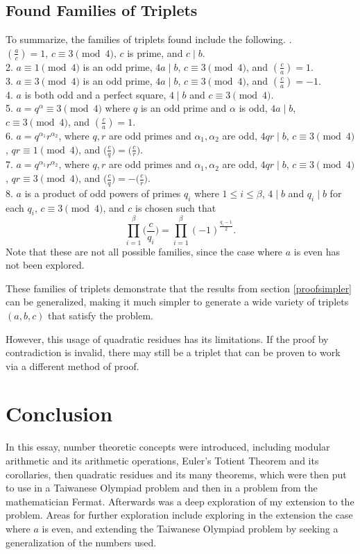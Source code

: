 \documentclass{article}
\newcommand{\al}{\alpha}
\newcommand{\qrB}[2]{\Big( \frac{#1}{#2}\Big)}
\newcommand{\qrbg}[2]{\bigg( \frac{#1}{#2}\bigg)}
\newcommand{\qrn}[2]{\left( \frac{#1}{#2}\right)}
\begin{document}
\subsection{Found Families of Triplets}
\label{foundfamilies}
To summarize, the families of triplets found include the following.
. $\qrn{a}{c} = 1, \hspace{2pt} c \equiv 3 \pmod 4, \hspace{2pt} c$ is prime, and $c \mid b$. \\
2. $a \equiv 1 \pmod 4$ is an odd prime, $4a \mid b$, $c \equiv 3 \pmod 4$, and $\qrn{c}{a}=1$. \\
3. $a \equiv 3 \pmod 4$ is an odd prime, $4a \mid b$, $c \equiv 3 \pmod 4$, and $\qrn{c}{a}=-1$. \\
4. $a$ is both odd and a perfect square, $4 \mid b$ and $c \equiv 3 \pmod 4$. \\
5. $a=q^{\al} \equiv 3 \pmod 4$ where $q$ is an odd prime and $\al$ is odd, $4a \mid b$, $c \equiv 3 \pmod 4$, and $\qrn{c}{a} = 1$. \\
6. $a = q^{\al_1}r^{\al_2}$, where $q,r$ are odd primes and $\al_1, \al_2$ are odd, $4qr \mid b$, $c \equiv 3 \pmod 4$, $qr \equiv 1 \pmod 4$, and $\qrB{c}{q}=\qrB{c}{r}$. \\
7. $a = q^{\al_1}r^{\al_2}$, where $q,r$ are odd primes and $\al_1, \al_2$ are odd, $4qr \mid b$, $c \equiv 3 \pmod 4$, $qr \equiv 3 \pmod 4$, and $\qrB{c}{q}=-\qrB{c}{r}$. \\
8. $a$ is a product of odd powers of primes $q_i$ where $1 \le i \le \beta$, $4 \mid b$ and $q_i \mid b$ for each $q_i$, $c \equiv 3 \pmod 4$, and $c$ is chosen such that \[\prod_{i=1}^{\beta}\qrbg{c}{q_i}=\prod_{i=1}^{\beta} (-1)^{\frac{q_i-1}{2}}.\]
Note that these are not all possible families, since the case where $a$ is even has not been explored.

These families of triplets demonstrate that the results from section \ref{proofsimpler} can be generalized, making it much simpler to generate a wide variety of triplets $(a,b,c)$ that satisfy the problem.

However, this usage of quadratic residues has its limitations. If the proof by contradiction is invalid, there may still be a triplet that can be proven to work via a different method of proof.
\newpage
\section{Conclusion}
In this essay, number theoretic concepts were introduced, including modular arithmetic and its arithmetic operations, Euler's Totient Theorem and its corollaries, then quadratic residues and its many theorems, which were then put to use in a Taiwanese Olympiad problem and then in a problem from the mathematician Fermat. Afterwards was a deep exploration of my extension to the problem. Areas for further exploration include exploring in the extension the case where $a$ is even, and extending the Taiwanese Olympiad problem by seeking a generalization of the numbers used. 
\end{document}
